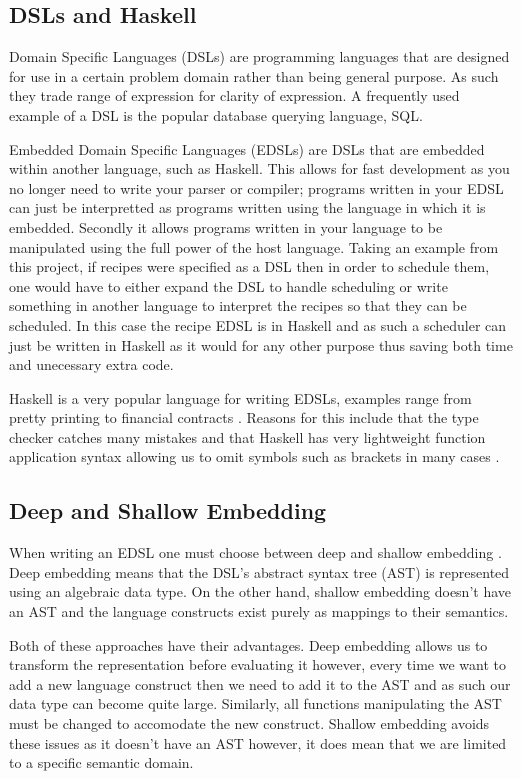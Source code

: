 \documentclass[11pt]{article}
\begin{document}
\subsection{DSLs and Haskell}
Domain Specific Languages (DSLs) are programming languages that
are designed for use in a certain problem domain rather than
being general purpose. As such they trade range of expression
for clarity of expression. A frequently used example of a DSL
is the popular database querying language, SQL.

\medbreak

Embedded Domain Specific Languages (EDSLs) are DSLs that are embedded
within another language, such as Haskell. This allows for
fast development as you no longer need to write your parser
or compiler; programs written in your EDSL can just be interpretted
as programs written using the language in which it is embedded.
Secondly it allows programs written in your language to be
manipulated using the full power of the host language. Taking
an example from this project, if recipes were specified as a DSL
then in order to schedule them, one would have to either expand
the DSL to handle scheduling or write something in another language
to interpret the recipes so that they can be scheduled. In this
case the recipe EDSL is in Haskell and as such a scheduler can
just be written in Haskell as it would for any other purpose thus
saving both time and unecessary extra code.

\medbreak

Haskell is a very popular language for writing EDSLs, examples
range from pretty printing \cite{pretty} to financial contracts \cite{contracts}.
Reasons for this include that the type checker catches many mistakes
and that Haskell has very lightweight function application syntax
allowing us to omit symbols such as brackets in many cases \cite{snoyman}.

\subsection{Deep and Shallow Embedding}
When writing an EDSL one must choose between deep and shallow embedding \cite{embedding}.
Deep embedding means that the DSL's abstract syntax tree (AST) is
represented using an algebraic data type. On the other hand, shallow
embedding doesn't have an AST and the language constructs exist purely
as mappings to their semantics.

\medbreak

Both of these approaches have their advantages. Deep embedding
allows us to transform the representation before evaluating
it however, every time we want to add a new language construct
then we need to add it to the AST and as such our data type
can become quite large. Similarly, all functions manipulating
the AST must be changed to accomodate the new construct. Shallow
embedding avoids these issues as it doesn't have an AST however,
it does mean that we are limited to a specific semantic domain.
\end{document}
